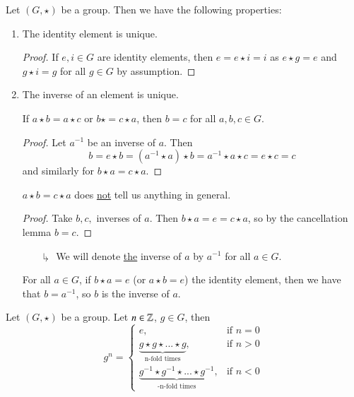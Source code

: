 \documentclass[12pt, a4paper, oneside, openright, titlepage]{book}
\begin{document}
\begin{prop}
    Let $(G,\star)$ be a group. Then we have the following properties:
    \begin{enumerate}
        \item The identity element is unique.
        \begin{proof}
            If $e,i \in G$ are identity elements, then $e = e\star i = i$ as $e \star g = e$ and $g \star i = g$ for all $g \in G$ by assumption.
        \end{proof}
        \item The inverse of an element is unique.
        \begin{lem}
            If $a \star b = a \star c$ or $b \star = c \star a$, then $b = c$ for all $a,b,c \in G$. 
        \end{lem}
        \begin{proof}
            Let $a^{-1}$ be an inverse of $a$. Then $$b = e\star b = (a^{-1} \star a) \star b = a^{-1} \star a \star c = e \star c = c$$ and similarly for $b \star a = c \star a$.
        \end{proof}
        \begin{rmk}
            $a \star b = c \star a$ does \underline{not} tell us anything in general.
        \end{rmk}
        \begin{proof}
            Take $b,c,$ inverses of $a$. Then $b \star a = e = c \star a$, so by the cancellation lemma $b = c$.
        \end{proof}
        \begin{enumerate}
            \item[$\drsh$] We will denote \underline{the} inverse of $a$ by $a^{-1}$ for all $a \in G$. 
        \end{enumerate}
        \begin{cor}
            For all $a \in G$, if $b \star a = e$ (or $a \star b = e$) the identity element, then we have that $b = a^{-1}$, so $b$ is the inverse of $a$.
        \end{cor}
    \end{enumerate}
\end{prop}


\begin{defn}
    Let $(G, \star)$ be a group. Let $n \in \mathbb Z$, $g \in G$, then \begin{equation}
        g^n = \left\{\begin{array}{ll} e, & \text{if } n = 0 \\ \underbrace{g\star g \star ... \star g}_{\text{n-fold times}}, & \text{if } n > 0 \\ \underbrace{g^{-1}\star g^{-1} \star ... \star g^{-1}}_{\text{-n-fold times}}, & \text{if } n < 0\end{array}\right.
    \end{equation}
\end{defn}
\end{document}
